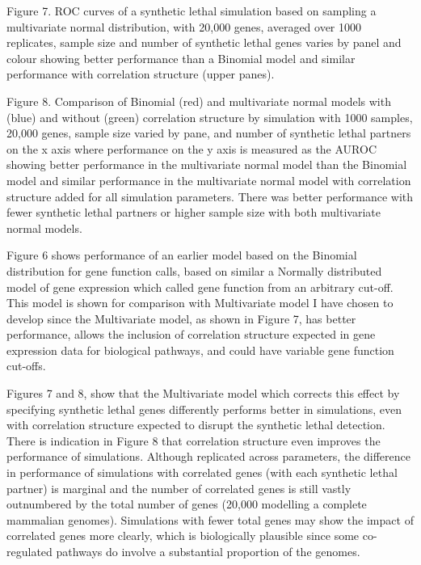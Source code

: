 Figure 7.   \gls{ROC} curves of a \gls{synthetic lethal} simulation based on sampling a multivariate normal distribution, with 20,000 genes, averaged over 1000 replicates, sample size and number of \gls{synthetic lethal} genes varies by panel and colour showing better performance than a Binomial model and similar performance with correlation structure (upper panes).

Figure 8.  Comparison of Binomial (red) and multivariate normal models with (blue) and without (green) correlation structure by simulation with 1000 samples, 20,000 genes, sample size varied by pane, and number of \gls{synthetic lethal} partners on the x axis where performance on the y axis is measured as the \gls{AUROC} showing better performance in the multivariate normal model than the Binomial model and similar performance in the multivariate normal model with correlation structure added for all simulation parameters.  There was better performance with fewer \gls{synthetic lethal} partners or higher sample size with both multivariate normal models.   

Figure 6 shows performance of an earlier model based on the Binomial distribution for gene function calls, based on similar a Normally distributed model of \gls{gene expression} which called gene function from an arbitrary  cut-off.  This model is shown for comparison with Multivariate model I have chosen to develop since the Multivariate model, as shown in Figure 7, has better performance, allows the inclusion of correlation structure expected in \gls{gene expression} data for biological pathways, and could have variable gene function cut-offs.  

Figures 7 and 8, show that the Multivariate model which corrects this effect by specifying \gls{synthetic lethal} genes differently performs better in simulations, even with correlation structure expected to disrupt the \gls{synthetic lethal} detection.  There is indication in Figure 8 that correlation structure even improves the performance of simulations.  Although replicated across parameters, the difference in performance of simulations with correlated genes (with each \gls{synthetic lethal} partner) is marginal and the number of correlated genes is still vastly outnumbered by the total number of genes (20,000 modelling a complete mammalian \glspl{genome}).  Simulations with fewer total genes may show the impact of correlated genes more clearly, which is biologically plausible since some co-regulated pathways do involve a substantial proportion of the \glspl{genome}.

